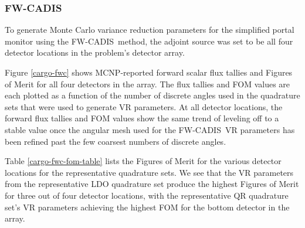 \documentclass{article} %
\newcommand{\fwc}{\mbox{FW-CADIS}}
\begin{document}
\FloatBarrier
\subsubsection{\fwc}

To generate Monte Carlo variance reduction parameters for the simplified portal
monitor using the \fwc\ method, the adjoint source was set to be all four
detector locations in the problem's detector array.

Figure \ref{cargo-fwc} shows MCNP-reported forward scalar flux tallies and
Figures of Merit for all four detectors in the array. The flux tallies and FOM
values are each plotted as a function of the number of discrete angles used in
the quadrature sets that were used to generate VR parameters. At all
detector locations, the forward flux tallies and FOM values show the same
trend of leveling off to a stable value once the angular mesh used for the
\fwc\ VR parameters has been refined past the few coarsest numbers of discrete
angles.

Table \ref{cargo-fwc-fom-table} lists the Figures of Merit for the various
detector locations for the representative quadrature sets. We see that the
VR parameters from the representative LDO quadrature set produce the
highest Figures of Merit for three out of four detector locations, with the
representative QR quadrature set's VR parameters achieving the highest FOM
for the bottom detector in the array.
\end{document}
